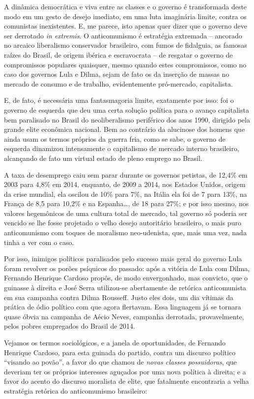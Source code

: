 A dinâmica democrática e viva entre as classes e o governo é
transformada deste modo em um gesto de desejo imediato, em uma luta
imaginária limite, contra os comunistas inexistentes. E, me parece, isto
apenas quer dizer que o governo deve ser derrotado \emph{in extremis}. O
anticomunismo é estratégia extremada -- ancorado no arcaico liberalismo
conservador brasileiro, com fumos de fidalguia, as famosas raízes do
Brasil, de origem ibérica e escravocrata -- de resgatar o governo de
compromissos populares quaisquer, mesmo quando estes compromissos, como
no caso dos governos Lula e Dilma, sejam de fato os da inserção de
massas no mercado de consumo e de trabalho, evidentemente pró-mercado,
capitalista.

E, de fato, é necessária uma fantasmagoria limite, exatamente por isso:
foi o governo de esquerda que deu uma certa solução política para o
avanço capitalista bem paralisado no Brasil do neoliberalismo periférico
dos anos 1990, dirigido pela grande elite econômica nacional. Bem ao
contrário da alucinose dos homens que ainda usam os termos próprios da
guerra fria, como se sabe, o governo de esquerda dinamizou intensamente
o capitalismo de mercado interno brasileiro, alcançando de fato um
virtual estado de pleno emprego no Brasil.

A taxa de desemprego caiu sem parar durante os governos petistas, de
12,4\% em 2003 para 4,8\% em 2014, enquanto, de 2009 a 2014, nos Estados
Unidos, origem da crise mundial, ela oscilou de 10\% para 7\%, na Itália
ela foi de 7 para 13\%, na França de 8,5 para 10,2\% e na Espanha…, de
18 para 27\%; e por isso mesmo, nos valores hegemônicos de uma cultura
total de mercado, tal governo só poderia ser vencido se lhe fosse
projetado o velho desejo autoritário brasileiro, o mais puro
anticomunismo com toques de moralismo neo-udenista, que, mais uma vez,
nada tinha a ver com o caso.

Por isso, inimigos políticos paralisados pelo sucesso mais geral do
governo Lula foram revolver os porões psíquicos do passado: após a
vitória de Lula com Dilma, Fernando Henrique Cardoso propôs, de modo
envergonhado, mas convicto, que o  guinasse à direita e José Serra
utilizou-se abertamente de retórica anticomunista em sua campanha contra
Dilma Rousseff. Justo eles dois, um dia vítimas da prática de ódio
político com que agora flertavam. Essa linguagem já se tornara quase
óbvia na campanha de Aécio Neves, campanha derrotada, provavelmente,
pelos pobres empregados do Brasil de 2014.

Vejamos os termos sociológicos, e a janela de oportunidades, de Fernando
Henrique Cardoso, para esta guinada do partido, contra um discurso
político ``visando ao povão'', a favor do que chamou de \emph{novas
classes possuidoras}, que deveriam ter os próprios interesses aguçados
por uma nova política à direita; e a favor do acento do discurso
moralista de elite, que fatalmente encontraria a velha estratégia
retórica do anticomunismo brasileiro:

